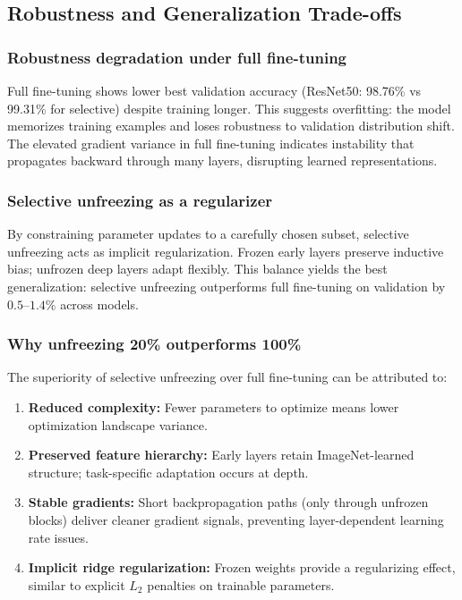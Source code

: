 \documentclass[11pt,a4paper]{article}
\begin{document}
\subsection{Robustness and Generalization Trade-offs}

\subsubsection*{Robustness degradation under full fine-tuning}
Full fine-tuning shows lower best validation accuracy (ResNet50: 98.76\% vs 99.31\% for selective) despite training longer. This suggests overfitting: the model memorizes training examples and loses robustness to validation distribution shift. The elevated gradient variance in full fine-tuning indicates instability that propagates backward through many layers, disrupting learned representations.

\subsubsection*{Selective unfreezing as a regularizer}
By constraining parameter updates to a carefully chosen subset, selective unfreezing acts as implicit regularization. Frozen early layers preserve inductive bias; unfrozen deep layers adapt flexibly. This balance yields the best generalization: selective unfreezing outperforms full fine-tuning on validation by $0.5$--$1.4\%$ across models.

\subsubsection*{Why unfreezing 20\% outperforms 100\%}
The superiority of selective unfreezing over full fine-tuning can be attributed to:
\begin{enumerate}
	\item \textbf{Reduced complexity:} Fewer parameters to optimize means lower optimization landscape variance.
	\item \textbf{Preserved feature hierarchy:} Early layers retain ImageNet-learned structure; task-specific adaptation occurs at depth.
	\item \textbf{Stable gradients:} Short backpropagation paths (only through unfrozen blocks) deliver cleaner gradient signals, preventing layer-dependent learning rate issues.
	\item \textbf{Implicit ridge regularization:} Frozen weights provide a regularizing effect, similar to explicit $L_2$ penalties on trainable parameters.
\end{enumerate}
\end{document}
